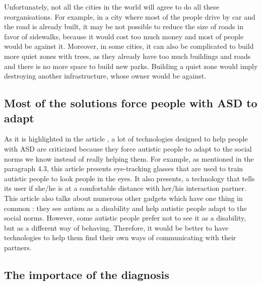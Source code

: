 Unfortunately, not all the cities in the world will agree to do all these reorganisations. For example, in a city where most of the people drive by car and the road is already built, it may be not possible to reduce the size of roads in favor of sidewalks, because it would cost too much money and most of people would be against it. Moreover, in some cities, it can also be complicated to build more quiet zones with trees, as they already have too much buildings and roads and there is no more space to build new parks. Building a quiet zone would imply destroying another infrastructure, whose owner would be against. 
\subsection{Most of the solutions force people with ASD to adapt}
As it is highlighted in the article \cite{2017UTravelSmartMobility}, a lot of technologies designed to help people with ASD are criticized because they force autistic people to adapt to the social norms we know instead of really helping them. For example, as mentioned in the paragraph 4.3, this article presents eye-tracking glasses that are used to train autistic people to look people in the eyes. It also presents, a technology that tells its user if she/he is at a comfortable distance with her/his interaction partner. This article also talks about numerous other gadgets which have one thing in common : they see autism as a disability and help autistic people adapt to the social norms. However, some autistic people prefer not to see it as a disability, but as a different way of behaving. Therefore, it would be better to have technologies to help them find their own ways of communicating with their partners. 
\subsection{The importace of the diagnosis}
